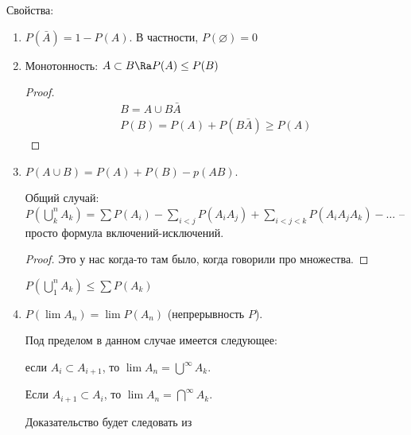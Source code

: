 Свойства:
\begin{enumerate}
    \item $P(\bar A) = 1 - P(A)$. В частности, $P(\varnothing) = 0$
    \item Монотонность: $A \subset B \Ra P(A) \leq P(B)$
    \begin{proof}
        \begin{gather*} 
            B = A \cup B\bar A \\
            P(B) = P(A) + P(B\bar A) \geq P(A)
        \end{gather*}
    \end{proof}
    \item $P(A \cup B) = P(A) + P(B) - p(AB)$. 
    
    Общий случай: $P(\bigcup\limits_k^n A_k) = \sum P(A_i) - \sum\limits_{i<j} P(A_iA_j) + \sum\limits_{i < j < k}P(A_iA_jA_k) - \dots$ -- просто формула включений-исключений.
    \begin{proof}
        Это у нас когда-то там было, когда говорили про множества.
    \end{proof}
    \begin{conseq}
    $P(\bigcup\limits_1^n A_k) \leq \sum P(A_k)$
    \end{conseq}

    \item
    $P(\lim A_n) = \lim P(A_n)$ (непрерывность $P$).

    Под пределом в данном случае имеется следующее: 
    
    если $A_i \subset A_{i+1}$, то $\lim A_n = \bigcup\limits^{\infty} A_k$. 
    
    Если $A_{i+1} \subset A_{i}$, то $\lim A_n = \bigcap\limits^{\infty} A_k$. 

    Доказательство будет следовать из


\end{enumerate}
